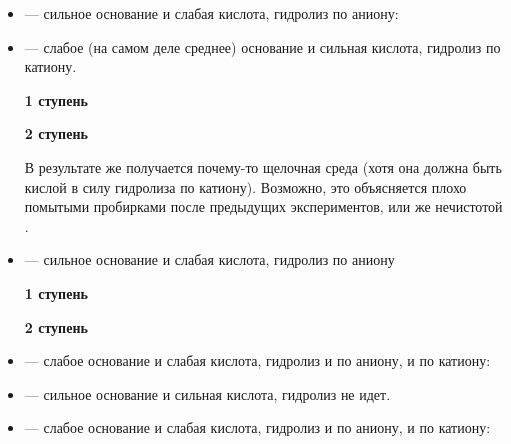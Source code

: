 \documentclass[a4paper, 12pt]{article}
\begin{document}
\begin{itemize}
	\item {} --- сильное основание и слабая кислота, гидролиз по аниону:
	
	
	
	\item {} --- слабое (на самом деле среднее) основание и сильная кислота, гидролиз по катиону.
	
	\textbf{1 ступень}
	
	
	
	\textbf{2 ступень}
	
	
	
	В результате же получается почему-то щелочная среда (хотя она должна быть кислой в силу гидролиза по катиону). Возможно, это объясняется плохо помытыми пробирками после предыдущих экспериментов, или же нечистотой .
	
	\item {} --- сильное основание и слабая кислота, гидролиз по аниону
	
	\textbf{1 ступень}
	
	
	
	\textbf{2 ступень}
	
	
	
	\item {} --- слабое основание и слабая кислота, гидролиз и по аниону, и по катиону:
	
	
	
	\item {} --- сильное основание и сильная кислота, гидролиз не идет.
	
	\item {} --- слабое основание и слабая кислота, гидролиз и по аниону, и по катиону:
	
	

\end{itemize}
\end{document}
